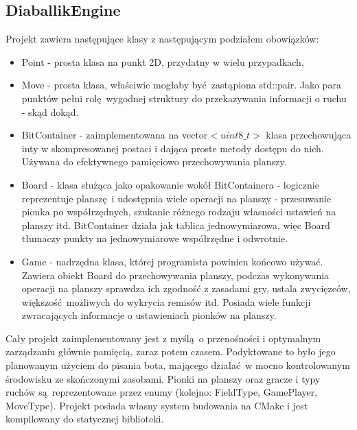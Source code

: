 \documentclass[a4paper,12pt]{article}
\begin{document}
\subsection{DiaballikEngine}
Projekt zawiera następujące klasy z następującym podziałem obowiązków:
\begin{itemize}
 \item Point - prosta klasa na punkt 2D, przydatny w wielu przypadkach,
 \item Move - prosta klasa, właściwie mogłaby być zastąpiona std::pair. Jako para punktów pełni rolę wygodnej struktury do przekazywania informacji
 o ruchu - skąd dokąd.
 \item BitContainer - zaimplementowana na vector$<uint8\_t>$ klasa przechowująca inty w skompresowanej postaci i dająca proste metody dostępu do nich.
 Używana do efektywnego pamięciowo przechowywania planszy.
 \item Board - klasa służąca jako opakowanie wokół BitContainera - logicznie reprezentuje planszę i udostępnia wiele operacji na planszy - 
 przesuwanie pionka po współrzędnych, szukanie różnego rodzaju własności ustawień na planszy itd. BitContainer działa jak tablica jednowymiarowa, więc
 Board tłumaczy punkty na jednowymiarowe współrzędne i odwrotnie.
 \item Game - nadrzędna klasa, której programista powinien końcowo używać. Zawiera obiekt Board do przechowywania planszy, podczas wykonywania
 operacji na planszy sprawdza ich zgodność z zasadami gry, ustala zwycięzców, większość możliwych do wykrycia remisów itd. Posiada wiele funkcji
 zwracających informacje o ustawieniach pionków na planszy.
\end{itemize}
Cały projekt zaimplementowany jest z myślą o przenośności i optymalnym zarządzaniu głównie pamięcią, zaraz potem czasem. Podyktowane to było jego
planowanym użyciem do pisania bota, mającego działać w mocno kontrolowanym środowisku ze skończonymi zasobami.
Pionki na planszy oraz gracze i typy ruchów są reprezentowane przez enumy (kolejno: FieldType, GamePlayer, MoveType).
Projekt posiada własny system budowania na CMake i jest kompilowany do statycznej biblioteki.
\end{document}
